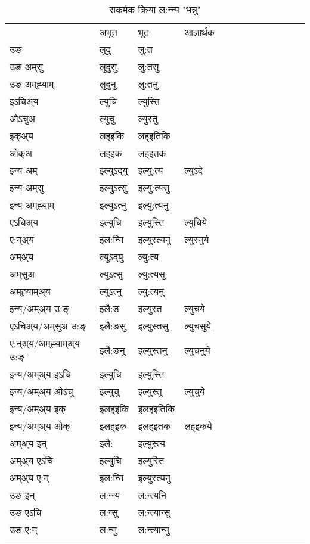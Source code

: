 \begin{table}[H]
\centering
\caption{\label{ut.vt} सकर्मक क्रिया  ल:न्‍न्य  "भन्नु"  }
\begin{tabular}{l|l|l|l|l|l|l|l|l|l|l|l|l}  \toprule
&अभूत & भूत & आज्ञार्थक \\ 
उङ &लुदु &लु:त \\ 
उङ अम्‌सु &लुदुसु &लु:तसु \\ 
उङ अम्‌ह्‍याम् &लुदुनु &लु:तनु \\ 
इऽचिअ्य &ल्युचि &ल्युस्ति   \\ 
ओऽचुअ &ल्युचु &ल्युस्तु   \\ 
इक्अ्य &लह्इकि &लह्इतिकि   \\ 
ओक्अ &लह्इक &लह्इतक   \\ 
इन्य अम् & इल्युऽद्‌यु  & इल्यु:त्य &ल्युऽदे  \\ 
इन्य अम्‌सु & इल्युऽत्सु  & इल्यु:त्यसु   \\ 
इन्य अम्‌ह्‍याम् & इल्युऽत्‍नु  & इल्यु:त्यनु   \\ 
एऽचिअ्य & इल्युचि & इल्युस्ति &ल्युचिये    \\ 
ए:न्अ्य & इल:न्‍नि  & इल्युस्त्यनु &ल्युस्‍नुये  \\ 
अम्अ्य & ल्युऽद्‌यु  & ल्यु:त्य  \\ 
अम्‌सुअ & ल्युऽत्सु & ल्यु:त्यसु  \\ 
अम्‌ह्‍याम्अ्य & ल्युऽत्‍नु  & ल्यु:त्यनु \\ 
\midrule
इन्य/अम्अ्य उ:ङ्‌&इलै:ङ & इल्युस्त &ल्युचये \\ 
एऽचिअ्य/अम्‌सुअ उ:ङ्‌ &इलै:ङसु & इल्युस्तसु &ल्युचसुये \\ 
ए:न्अ्य/अम्‌ह्‍याम्अ्य उ:ङ्‌ &इलै:ङनु & इल्युस्तनु &ल्युचनुये \\ 
इन्य/अम्अ्य इऽचि & इल्युचि & इल्युस्ति    \\ 
इन्य/अम्अ्य ओऽचु & इल्युचु & इल्युस्तु  &ल्युचुये  \\ 
इन्य/अम्अ्य इक् & इलह्इकि & इलह्इतिकि   \\ 
इन्य/अम्अ्य ओक् & इलह्इक & इलह्इतक  &लह्इकये  \\ 
अम्अ्य इन् & इलै: & इल्युस्त्य   \\ 
अम्अ्य एऽचि & इल्युचि & इल्युस्ति    \\ 
अम्अ्य ए:न् & इल:न्‍नि  & इल्युस्त्यनु  \\ 
\midrule
उङ इन् & ल:न्‍न्य  & ल:न्त्यनि  \\ 
उङ एऽचि & ल:न्सु  & ल:न्त्यान्सु   \\ 
उङ ए:न्& ल:न्‍नु  & ल:न्त्यान्‍नु   \\ 
\bottomrule
\end{tabular}
\end{table}


